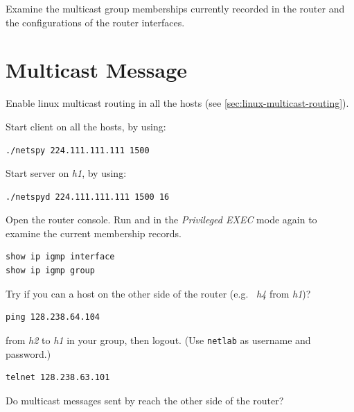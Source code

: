\documentclass{../UTNetLab}
\begin{document}
\begin{report}
    \item Examine the multicast group memberships currently recorded in the router and the configurations of the router interfaces.
\end{report}

\section{Multicast Message}
Enable linux multicast routing in all the hosts (see \autoref{sec:linux-multicast-routing}).

Start  client on all the hosts, by using:
\begin{lstlisting}
./netspy 224.111.111.111 1500
\end{lstlisting}

Start  server on \textit{h1}, by using:
\begin{lstlisting}
./netspyd 224.111.111.111 1500 16
\end{lstlisting}

Open the router console.
Run  and  in the \textit{Privileged EXEC} mode again to examine the current membership records.

\begin{lstlisting}[language=cisco]
show ip igmp interface
show ip igmp group
\end{lstlisting}

Try if you can  a host on the other side of the router (e.g.\  \textit{h4} from \textit{h1})?

\begin{lstlisting}
ping 128.238.64.104
\end{lstlisting}

 from \textit{h2} to \textit{h1} in your group, then logout. (Use \texttt{netlab} as username and password.)

\begin{lstlisting}
telnet 128.238.63.101
\end{lstlisting}
Do multicast messages sent by  reach the other side of the router?
\end{document}
